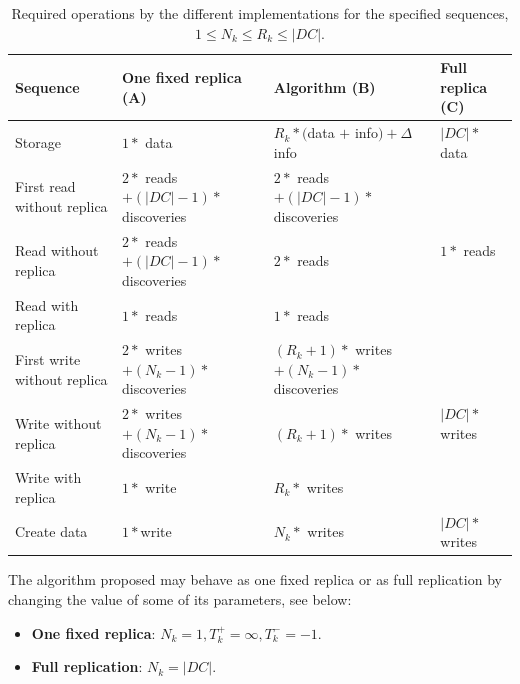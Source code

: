 \documentclass[english]{article}
\begin{document}
\begin{table}
	\centering
	\begin{tabular}{|l||l|l|l|}
		\hline
		{\bf Sequence} & {\bf One fixed replica {\small (A)}} &  {\bf Algorithm {\small (B)}} & {\bf Full replica {\small (C)}} \\
		\hline
		\hline
		Storage                              & $1 * $ data
												  & $R_{k} * ($data $ + $ info$) + \Delta$info
												  & $|DC| * $ data \\
		\hline

		\hline
		First read without replica   & $2 * $ reads $ + (|DC| - 1) * $ discoveries 
								                  & $2 * $ reads $ + (|DC| - 1) * $ discoveries 
								                  & \multirow{3}{*}{$1 * $ reads} \\
	    \cline{1-3}
		Read without replica          & $2 * $ reads $ + (|DC| - 1) * $ discoveries
									              & $2 * $ reads 
				                                  & \\
		\cline{1-3}
		Read with replica               & $1 * $ reads
												  & $1 * $ reads
												  & \\
		\hline

		\hline
		First write without replica   & $2 * $ writes $ + (N_{k} - 1) * $ discoveries
												   & $(R_{k} + 1) * $ writes $ + (N_{k} - 1) * $ discoveries
												   & \multirow{3}{*}{$|DC| * $ writes} \\
		\cline{1-3}
		Write without replica           & $2 * $ writes $ + (N_{k} - 1) * $ discoveries
												   &  $(R_{k} + 1) * $ writes
												   & \\
		\cline{1-3}
		Write with replica                & $1 * $ write
												   & $R_{k} * $ writes
												   & \\
		\hline
		
		\hline
		Create data                         & $1 * $write
												   & $N_{k} * $ writes
												   & $|DC| * $ writes \\
		\hline
	\end{tabular}

	\caption{Required operations by the different implementations for the specified sequences, $1 \le N_{k} \le R_{k} \le |DC|$.}
	\label{tb:implementations_sds}
\end{table}

The algorithm proposed may behave as one fixed replica or as full replication by changing the value of some of its parameters, see below:
\begin{itemize}
	\item {\bf One fixed replica}: $N_{k} = 1, T^{+}_{k} = \infty, T^{-}_{k} = -1$.

	\item {\bf Full replication}: $N_{k} = |DC|$.
\end{itemize}
\end{document}
